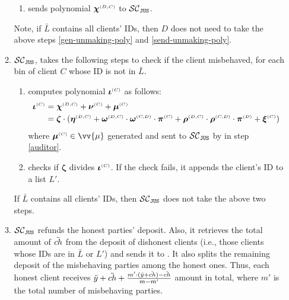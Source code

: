 \begin{enumerate}
\begin{enumerate}
\begin{enumerate}
  \item\label{send-unmaking-poly} sends  polynomial $\bm\chi^{ \scriptscriptstyle {  {(D, C)}}}$ to  $\mathcal{SC}_{\mathtt{JUS}}$. 
  

 \end{enumerate}
  Note, if $\bar L$ contains all clients' IDs, then $D$ does not need to take the above steps \ref{gen-unmaking-poly} and \ref{send-unmaking-poly}. 
 
 \item  $\mathcal{SC}_{\mathtt{JUS}}$,   takes the following steps to check if the client misbehaved,  for each bin of client $    {  C}$ whose ID is not in $\bar L$.
 
 
  \begin{enumerate}
  
 \item computes  polynomial $\bm\iota^{\scriptscriptstyle  {  {(C)}}}$ as follows: 
  \begin{equation*}
\begin{split}
 \bm\iota^{ \scriptscriptstyle {  {(C)}}}&=\bm\chi^{\scriptscriptstyle  {  {(D, C)}}}+\bm\nu^{\scriptscriptstyle  {  {(C)}}} +\bm\mu^{ \scriptscriptstyle {  {(C)}}} \\ 
 &=\bm\zeta\cdot(\bm\eta^{ \scriptscriptstyle {  {(D,C)}}} + \bm\omega^{ \scriptscriptstyle {  {(D,C)}}}\cdot \bm\omega^{ \scriptscriptstyle {  {(C,D)}}}\cdot \bm\pi^{ \scriptscriptstyle {  {(C)}}}+\bm\rho^{ \scriptscriptstyle {  {(D,C)}}}\cdot \bm\rho^{ \scriptscriptstyle {  {(C,D)}}}\cdot \bm\pi^{ \scriptscriptstyle {  {(D)}}}+\bm\xi^{ \scriptscriptstyle {  {(C)}}})
 \end{split}
\end{equation*}
 where $\bm\mu^{ \st {  {(C)}}} \in \vv{\mu}$ generated and sent to $\mathcal{SC}_{\mathtt{JUS}}$  by \aud in step \ref{auditor}.   
  \item checks if $\bm\zeta$  divides $\bm\iota^{ \scriptscriptstyle {  {(C)}}}$. If the check fails, it appends the client's ID to  a list $ L'$.
  \end{enumerate}
   If $\bar L$ contains all clients' IDs, then $\mathcal{SC}_{\mathtt{JUS}}$ does not take the above two steps. 

   \item  $\mathcal{SC}_{\mathtt{JUS}}$  refunds the honest parties' deposit. Also, it retrieves the total amount of  $\ddot{ch}$ from the deposit of dishonest clients (i.e., those clients whose IDs are in $\bar L$ or $L'$) and sends it to \aud.  It also splits the remaining deposit of the misbehaving parties among the honest ones. Thus, each honest client  receives $\ddot{y}+\ddot{ch}+\frac{m'\cdot (\ddot{y}+\ddot{ch})-\ddot{ch}}{m-m'}$ amount in total, where $m'$ is the total number of misbehaving parties.
 

\end{enumerate}
\end{enumerate}
